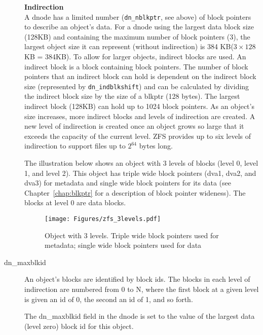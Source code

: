 \begin{description}
    \textbf{Indirection}\\
    A dnode has a limited number (\lstinline{dn_nblkptr}, see above) of block pointers
    to describe an object's data.
    For a dnode using the largest data block size (128KB)
    and containing the maximum number of block pointers (3),
    the largest object size it can represent (without indirection) is
    384 KB($3 \times 128$KB = 384KB).
    To allow for larger objects, indirect blocks are used.
    An indirect block is a block containing block pointers.
    The number of block pointers that
    an indirect block can hold is dependent on the indirect block size
    (represented by \lstinline{dn_indblkshift})
    and can be calculated by dividing the indirect block size by the size of a blkptr (128 bytes).
    The largest indirect block (128KB) can hold up to 1024 block pointers.
    As an object's size increases,
    more indirect blocks and levels of indirection are created.
    A new level of indirection is created once
    an object grows so large that it exceeds the capacity of the current level.
    ZFS provides up to six levels of indirection to support files up to $2^{64}$ bytes long.

    The illustration below shows an object with 3 levels of blocks (level 0, level 1, and level 2).
    This object has triple wide block pointers
    (dva1, dva2, and dva3) for metadata
    and single wide block pointers for its data
    (see Chapter~\ref{chap:blkptr} for a description of block pointer wideness).
    The blocks at level 0 are data blocks.
    \begin{figure}[ht]
      \centering
      \texttt{[image: Figures/zfs\_3levels.pdf]}
      \caption{Object with 3 levels. Triple wide block pointers used for metadata; single wide block pointers used for data}
      \label{fig:blkptr_three_levels}
    \end{figure}
  \item[dn\_maxblkid]
    An object's blocks are identified by block ids.
    The blocks in each level of indirection are numbered from 0 to N,
    where the first block at a given level is given an id of 0,
    the second an id of 1, and so forth.

    The dn\_maxblkid field in the dnode is set to
    the value of the largest data (level zero) block id for this object.


\end{description}
